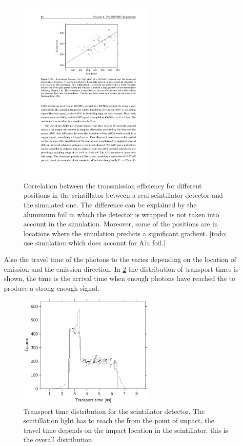 \begin{figure}
    \centering
    \includegraphics[width=0.6\textwidth]
                    {plots/station/scintilator_transmission_compared}
    \caption{Correlation between the transmission efficiency for different positions in the scintillator between a real scintillator detector and the simulated one. The difference can be explained by the aluminium foil in which the detector is wrapped is not taken into account in the simulation. Moreover, some of the positions are in locations where the simulation predicts a significant gradient. [todo; use simulation which does account for Alu foil.]}
    \label{fig:scintilator_transmission_compared}
\end{figure}

Also the travel time of the photons to the \pmt varies depending on the location of emission and the emission direction. In \cref{fig:transport_time} the distribution of transport times is shown, the time is the arrival time when enough photons have reached the \pmt to produce a strong enough signal.

\begin{figure}
    \centering
    \includegraphics[width=0.6\textwidth]
                    {plots/station/transport_time}
    \caption{Transport time distribution for the scintillator detector. The scintillation light has to reach the \pmt from the point of impact, the travel time depends on the impact location in the scintillator, this is the overall distribution.}
    \label{fig:transport_time}
\end{figure}

